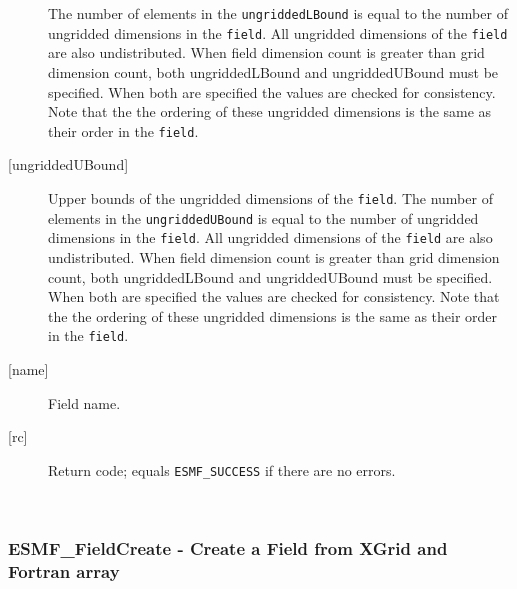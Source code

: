 \begin{description}
   The number of elements in the {\tt ungriddedLBound} is equal to the number of ungridded
   dimensions in the {\tt field}. All ungridded dimensions of the
   {\tt field} are also undistributed. When field dimension count is
   greater than grid dimension count, both ungriddedLBound and ungriddedUBound
   must be specified. When both are specified the values are checked
   for consistency. Note that the the ordering of
   these ungridded dimensions is the same as their order in the {\tt field}.
   \item [{[ungriddedUBound]}]
   Upper bounds of the ungridded dimensions of the {\tt field}.
   The number of elements in the {\tt ungriddedUBound} is equal to the number of ungridded
   dimensions in the {\tt field}. All ungridded dimensions of the
   {\tt field} are also undistributed. When field dimension count is
   greater than grid dimension count, both ungriddedLBound and ungriddedUBound
   must be specified. When both are specified the values are checked
   for consistency. Note that the the ordering of
   these ungridded dimensions is the same as their order in the {\tt field}.
   \item [{[name]}]
   Field name.
   \item [{[rc]}]
   Return code; equals {\tt ESMF\_SUCCESS} if there are no errors.
   \end{description} 
 
\mbox{}\hrulefill\ 
 
\subsubsection [ESMF\_FieldCreate] {ESMF\_FieldCreate - Create a Field from XGrid and Fortran array }


